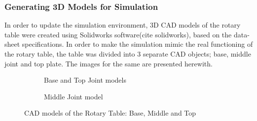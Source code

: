 \subsubsection{Generating 3D Models for Simulation}
In order to update the simulation environment, 3D CAD models of the rotary table were created using Solidworks software(cite solidworks), based on the data-sheet specifications. In order to make the simulation mimic the real functioning of the rotary table, the table was divided into 3 separate CAD objects; base, middle joint and top plate. The images for the same are presented herewith. 

\begin{figure}[!htbp] %
\begin{subfigure}{\linewidth}
      \caption[dd]{Base and Top Joint models}
   \end{subfigure}\par\medskip
   \begin{subfigure}{\linewidth}
   \centering
   \caption[dd]{Middle Joint model}
   \end{subfigure}
\caption[dd]{CAD models of the Rotary Table: Base, Middle and Top}
\label{fig:img11}
\end{figure}
 

